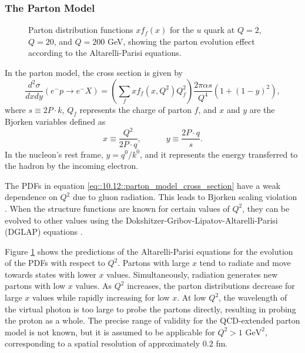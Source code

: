 \subsubsection{The Parton Model}
\label{10.12::parton_model}
    \begin{figure}[t!]
        \centering
        \caption[$Q^2$ dependence of $x$ PDF for the $u$ quark.]{Parton distribution functions $xf_f(x)$ for the $u$ quark at $Q = 2$, $Q = 20$, and $Q = 200$ GeV, showing the parton evolution effect according to the Altarelli-Parisi equations.} %
        \label{fig::10.12::q2_dependence}
    \end{figure}

    In the parton model, the cross section is given by
    \begin{equation}
        \label{eq::10.12::parton_model_cross_section}
        \frac{d^2\sigma}{dxdy} \left( e^-p \rightarrow e^-X \right) =
                \left( \sum_f xf_f \left( x, Q^2 \right) Q_f^2 \right)
                \frac{2\pi\alpha s}{Q^4} \left( 1 + \left( 1 - y \right)^2 \right),
    \end{equation}
    where $s \equiv 2P\cdot k$, $Q_f$ represents the charge of parton $f$, and $x$ and $y$ are the Bjorken variables defined as
    \begin{equation*}
        x \equiv \frac{Q^2}{2P\cdot q}, \hspace{36pt} y \equiv \frac{2 P\cdot q}{s}.
    \end{equation*}
    In the nucleon's rest frame, $y = q^0/k^0$, and it represents the energy transferred to the hadron by the incoming electron.

    The PDFs in equation \eqref{eq::10.12::parton_model_cross_section} have a weak dependence on $Q^2$ due to gluon radiation.
    This leads to Bjorken scaling violation \cite{halzen1991}.
    When the structure functions are known for certain values of $Q^2$, they can be evolved to other values using the Dokshitzer-Gribov-Lipatov-Altarelli-Parisi (DGLAP) equations \cite{dokshitzer1991}.

    Figure \ref{fig::10.12::q2_dependence} shows the predictions of the Altarelli-Parisi equations for the evolution of the PDFs with respect to $Q^2$.
    Partons with large $x$ tend to radiate and move towards states with lower $x$ values.
    Simultaneously, radiation generates new partons with low $x$ values.
    As $Q^2$ increases, the parton distributions decrease for large $x$ values while rapidly increasing for low $x$.
    At low $Q^2$, the wavelength of the virtual photon is too large to probe the partons directly, resulting in probing the proton as a whole.
    The precise range of validity for the QCD-extended parton model is not known, but it is assumed to be applicable for $Q^2 > 1 \text{ GeV}^2$, corresponding to a spatial resolution of approximately $0.2$ fm.
